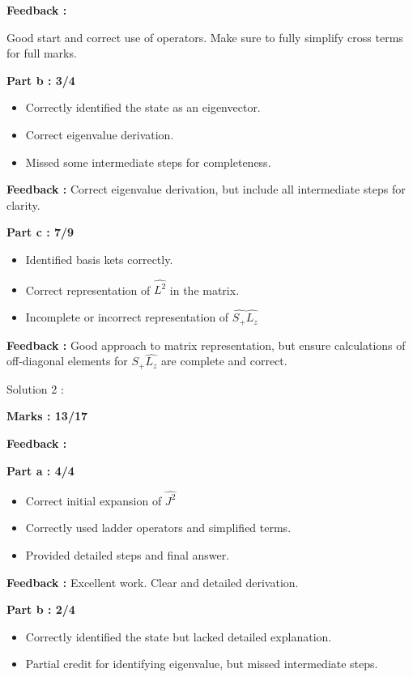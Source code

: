 \documentclass[a4paper,11pt]{article}
\begin{document}
\textbf{Feedback :}

Good start and correct use of operators. Make sure to fully simplify cross terms for full marks.



\textbf{Part b : 3/4}

\begin{itemize}
    \item Correctly identified the state as an eigenvector.
    \item Correct eigenvalue derivation.
    \item Missed some intermediate steps for completeness.
\end{itemize}

\textbf{Feedback :}
Correct eigenvalue derivation, but include all intermediate steps for clarity.


\textbf{Part c : 7/9}

\begin{itemize}
    \item Identified basis kets correctly.
    \item Correct representation of $\hat{L^2}$ in the matrix.
    \item Incomplete or incorrect representation of $\hat{S_+}\hat{L_z}$
\end{itemize}

\textbf{Feedback :}
Good approach to matrix representation, but ensure calculations of off-diagonal elements for $\hat{S_+}\hat{L_z}$ are complete and correct.


Solution 2 :

\textbf{Marks : 13/17}

\textbf{Feedback : }

\textbf{Part a : 4/4}

\begin{itemize}
    \item Correct initial expansion of $\hat{J^2}$
    \item Correctly used ladder operators and simplified terms.
    \item Provided detailed steps and final answer.
\end{itemize}

\textbf{Feedback :}
Excellent work. Clear and detailed derivation.


\textbf{Part b : 2/4}

\begin{itemize}
    \item Correctly identified the state but lacked detailed explanation.
    \item Partial credit for identifying eigenvalue, but missed intermediate steps.
\end{itemize}
\end{document}
